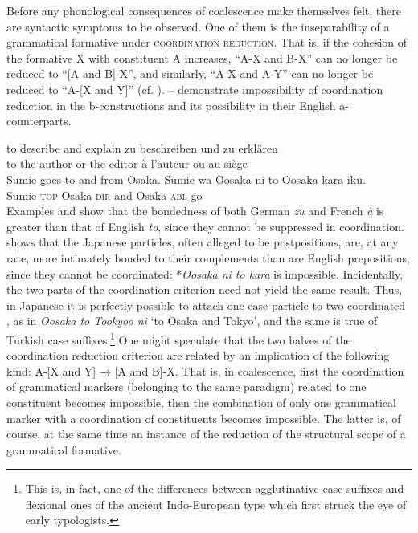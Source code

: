 Before any phonological consequences of coalescence make themselves felt, there are syntactic symptoms to be observed. One of them is the inseparability of a grammatical formative under \textsc{coordination reduction}. That is, if the cohesion of the formative X with constituent A increases, ``A-X and B-X'' can no longer be reduced to ``[A and B]-X'', and similarly, ``A-X and A-Y'' can no longer be reduced to ``A-[X and Y]'' (cf. \citealt[198--201]{MallinsonEtAl1981}). -- demonstrate impossibility of coordination reduction in the b-constructions and its possibility in their English a-counterparts.
 
\ea\label{ex:E105}
\langinfo{\LangGerm}{}{} 
 \ea to describe and explain 
 \ex zu beschreiben und zu erklären
\z
\z
\noindent \ea\label{ex:E106}
\langinfo{\LangFren}{}{} \\

\ea to the author or the editor
\ex à l'auteur ou au siège
\z
\z
\enlargethispage{2\baselineskip}
\noindent \ea\label{ex:E107}
\\
 \ea  Sumie goes to and from Osaka. 
\ex
\gll Sumie  wa  Oosaka  ni  to  Oosaka  kara  iku.\\
   Sumie  \textsc{top}  Osaka  \textsc{dir}  and  Osaka  \textsc{abl}  go\\
\z
\z
\noindent \label{page161}Examples  and  show that the bondedness of both German \textit{zu} and French \textit{à} is greater than that of English \textit{to}, since they cannot be suppressed in coordination.  shows that the Japanese particles, often alleged to be postpositions, are, at any rate, more intimately bonded to their complements than are English prepositions, since they cannot be coordinated: *\textit{Oosaka ni to kara} is impossible. Incidentally, the two parts of the coordination criterion need not yield the same result. Thus, in Japanese it is perfectly possible to attach one case particle to two coordinated \nps, as in \textit{Oosaka to Tookyoo ni} ‘to Osaka and Tokyo’, and the same is true of Turkish case suffixes.\footnote{This is, in fact, one of the differences between agglutinative case suffixes and flexional ones of the ancient Indo-European type which first struck the eye of early typologists.} One might speculate that the two halves of the coordination reduction criterion are related by an implication of the following kind: A-[X and Y] → [A and B]-X. That is, in coalescence, first the coordination of grammatical markers (belonging to the same paradigm) related to one constituent becomes impossible, then the combination of only one grammatical marker with a coordination of constituents becomes impossible. The latter is, of course, at the same time an instance of the reduction of the structural scope of a grammatical formative.\label{page161b}

